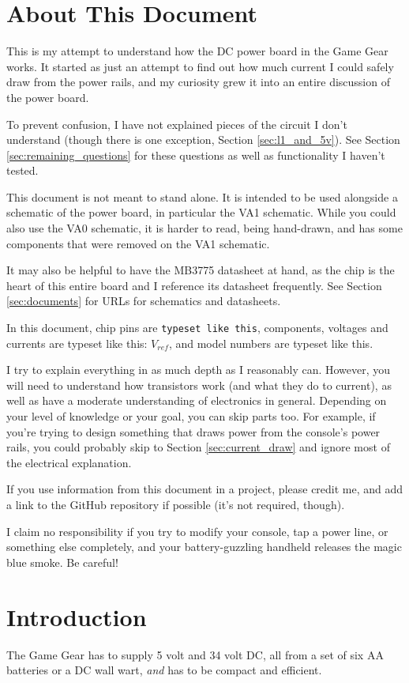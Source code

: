 \documentclass{article}
\newcommand{\Vref}{$V_{ref}$}
\newcommand{\chippin}{\texttt}
\newcommand{\model}{\textsf}
\begin{document}
\section{About This Document}
This is my attempt to understand how the DC power board in the Game
Gear works. It started as just an attempt to find out how much current
I could safely draw from the power rails, and my curiosity grew it
into an entire discussion of the power board.

To prevent confusion, I have not explained pieces of the circuit I
don't understand (though there is one exception, Section
\ref{sec:l1_and_5v}). See Section \ref{sec:remaining_questions} for
these questions as well as functionality I haven't tested.

This document is not meant to stand alone. It is intended to be used
alongside a schematic of the power board, in particular the
\model{VA1} schematic. While you could also use the \model{VA0}
schematic, it is harder to read, being hand-drawn, and has some
components that were removed on the \model{VA1} schematic.

It may also be helpful to have the \model{MB3775} datasheet at hand,
as the chip is the heart of this entire board and I reference its
datasheet frequently. See Section \ref{sec:documents} for URLs for
schematics and datasheets.

In this document, chip pins are \chippin{typeset like this},
components, voltages and currents are typeset like this: \Vref{}, and
model numbers are \model{typeset like this}.

I try to explain everything in as much depth as I reasonably
can. However, you will need to understand how transistors work (and
what they do to current), as well as have a moderate understanding of
electronics in general. Depending on your level of knowledge or your
goal, you can skip parts too. For example, if you're trying to design
something that draws power from the console's power rails, you could
probably skip to Section \ref{sec:current_draw} and ignore most of the
electrical explanation.

If you use information from this document in a project, please credit
me, and add a link to the GitHub repository if possible (it's not
required, though).

I claim no responsibility if you try to modify your console, tap a
power line, or something else completely, and your battery-guzzling
handheld releases the magic blue smoke. Be careful!

\section{Introduction}
The Game Gear has to supply 5 volt and 34 volt DC, all from a set of
six AA batteries or a DC wall wart, \textit{and} has to be compact and
efficient.
\end{document}
